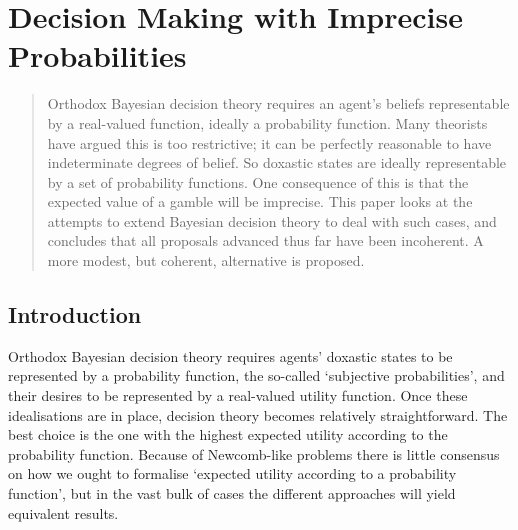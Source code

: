 \chapter[Imprecise Decision Theory]{Decision Making with Imprecise Probabilities}



\begin{quote}
Orthodox Bayesian decision theory requires an agent's beliefs
representable by a real-valued function, ideally a probability function.
Many theorists have argued this is too restrictive; it can be perfectly
reasonable to have indeterminate degrees of belief. So doxastic states
are ideally representable by a set of probability functions. One
consequence of this is that the expected value of a gamble will be
imprecise. This paper looks at the attempts to extend Bayesian decision
theory to deal with such cases, and concludes that all proposals
advanced thus far have been incoherent. A more modest, but coherent,
alternative is proposed.
\end{quote}

\section{Introduction}
Orthodox Bayesian decision theory requires agents' doxastic states to be
represented by a probability function, the so-called `subjective
probabilities', and their desires to be represented by a real-valued
utility function. Once these idealisations are in place, decision theory
becomes relatively straightforward. The best choice is the one with the
highest expected utility according to the probability function. Because
of Newcomb-like problems there is little consensus on how we ought to
formalise `expected utility according to a probability function', but in
the vast bulk of cases the different approaches will yield equivalent
results.

